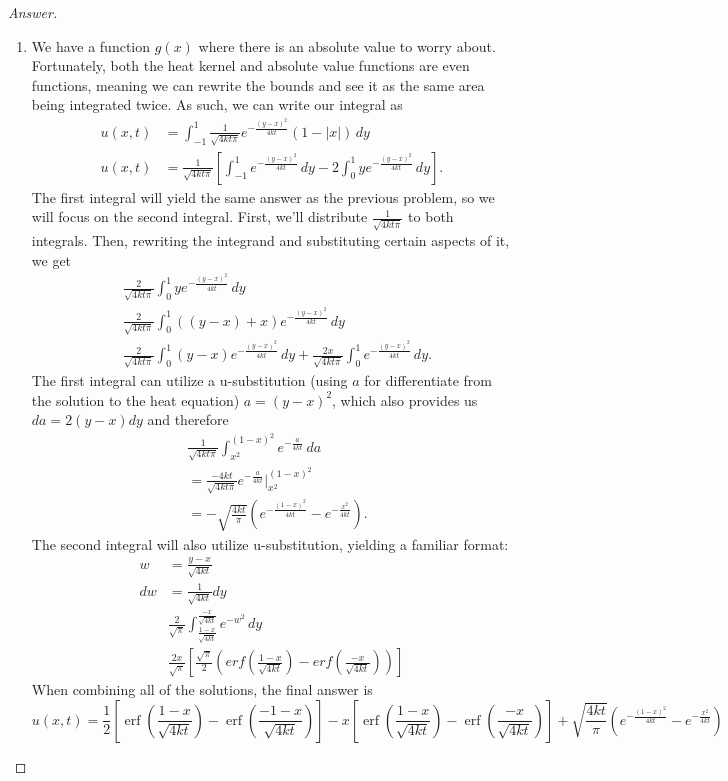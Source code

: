 \documentclass{article}
\theoremstyle{definition}
\renewcommand\qedsymbol{$\blacksquare$}
\newenvironment{ans}{\begin{proof}[Answer]\renewcommand{\qedsymbol}{}}{\end{proof}}
\DeclareMathOperator{\erf}{erf}
\begin{document}
\begin{ans}
\begin{enumerate}
        \item We have a function $g(x)$ where there is an absolute value to worry about. Fortunately, both the heat kernel and absolute value functions are even functions, meaning we can rewrite the bounds and see it as the same area being integrated twice. As such, we can write our integral as
        \begin{align*}
            u(x, t) &= \int_{-1}^1 \frac{1}{\sqrt{4kt\pi}}e^{-\frac{(y-x)^2}{4kt}} (1-|x|)\,dy\\
            u(x, t) &= \frac{1}{\sqrt{4kt\pi}} \left[ \int_{-1}^1 e^{-\frac{(y-x)^2}{4kt}}\,dy - 2\int_0^1 ye^{-\frac{(y-x)^2}{4kt}}\,dy \right].
        \end{align*}
        The first integral will yield the same answer as the previous problem, so we will focus on the second integral. First, we'll distribute $\frac{1}{\sqrt{4kt\pi}}$ to both integrals. Then, rewriting the integrand and substituting certain aspects of it, we get
        \begin{align*}
            & \frac{2}{\sqrt{4kt\pi}} \int_0^1 ye^{-\frac{(y-x)^2}{4kt}}\,dy\\
            & \frac{2}{\sqrt{4kt\pi}} \int_0^1 ((y-x)+x)e^{-\frac{(y-x)^2}{4kt}}\,dy\\
            & \frac{2}{\sqrt{4kt\pi}} \int_0^1 (y-x)e^{-\frac{(y-x)^2}{4kt}}\,dy + \frac{2x}{\sqrt{4kt\pi}} \int_0^1 e^{-\frac{(y-x)^2}{4kt}}\,dy.
        \end{align*}
        The first integral can utilize a u-substitution (using $a$ for differentiate from the solution to the heat equation) $a = (y-x)^2$, which also provides us $da = 2(y-x) dy$ and therefore
        \begin{align*}
            & \frac{1}{\sqrt{4kt\pi}} \int_{x^2}^{(1-x)^2} e^{-\frac{a}{4kt}}\,da\\
            &= \frac{-4kt}{\sqrt{4kt\pi}} e^{-\frac{a}{4kt}}|_{x^2}^{(1-x)^2}\\
            &= -\sqrt{\frac{4kt}{\pi}} \left( e^{-\frac{(1-x)^2}{4kt}} - e^{-\frac{x^2}{4kt}} \right).
        \end{align*}
        The second integral will also utilize u-substitution, yielding a familiar format:
        \begin{align*}
            w &= \frac{y-x}{\sqrt{4kt}}\\
            dw &= \frac{1}{\sqrt{4kt}} dy\\
            &\frac{2}{\sqrt{\pi}} \int_{\frac{1-x}{\sqrt{4kt}}}^{\frac{-x}{\sqrt{4kt}}} e^{-w^2}\,dy\\
            &\frac{2x}{\sqrt{\pi}} \left[ \frac{\sqrt{\pi}}{2} \left(erf\left(\frac{1-x}{\sqrt{4kt}}\right) - erf\left(\frac{-x}{\sqrt{4kt}}\right) \right) \right]
        \end{align*}
        When combining all of the solutions, the final answer is
        \[\boxed{ u(x,t) = \frac{1}{2} \left[ \erf\left(\frac{1-x}{\sqrt{4kt}}\right) - \erf\left(\frac{-1-x}{\sqrt{4kt}}\right) \right] - x \left[\erf\left(\frac{1-x}{\sqrt{4kt}}\right) - \erf\left(\frac{-x}{\sqrt{4kt}}\right) \right] + \sqrt{\frac{4kt}{\pi}} \left( e^{-\frac{(1-x)^2}{4kt}} - e^{-\frac{x^2}{4kt}} \right)}\]


\end{enumerate}
\end{ans}
\end{document}
